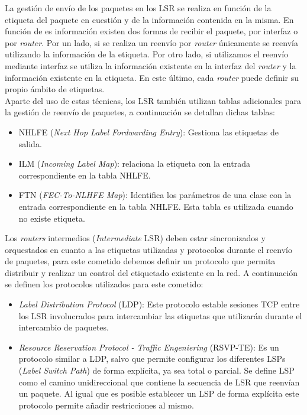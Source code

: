 	 La gestión de envío de los paquetes en los LSR se realiza en función de la etiqueta del paquete en cuestión y de la información contenida en la misma. En función de es información existen dos formas de recibir el paquete, por interfaz o por \textit{router}. Por un lado, si se realiza un reenvío por \textit{router} únicamente se reenvía utilizando la información de la etiqueta. Por otro lado, si utilizamos el reenvío mediante interfaz se utiliza la información existente en la interfaz del \textit{router} y la información existente en la etiqueta. En este último, cada \textit{router} puede definir su propio ámbito de etiquetas.\\
	 Aparte del uso de estas técnicas, los LSR también utilizan tablas adicionales para la gestión de reenvío de paquetes, a continuación se detallan dichas tablas:
	 \begin{itemize}
	     \item NHLFE (\textit{Next Hop Label Fordwarding Entry}): Gestiona las etiquetas de salida.
	     \item ILM (\textit{Incoming Label Map}): relaciona la etiqueta con la entrada correspondiente en la tabla NHLFE.
	     \item FTN (\textit{FEC-To-NLHFE Map}): Identifica los parámetros de una clase con la entrada correspondiente en la tabla NHLFE. Esta tabla es utilizada cuando no existe etiqueta.
	 \end{itemize}
	 Los \textit{routers} intermedios (\textit{Intermediate} LSR) deben estar sincronizados y orquestados en cuanto a las etiquetas utilizadas y protocolos durante el reenvío de paquetes, para este cometido debemos definir un protocolo que permita distribuir y realizar un control del etiquetado existente en la red. A continuación se definen los protocolos utilizados para este cometido:
	 \begin{itemize}
	     \item \textit{Label Distribution Protocol} (LDP): Este protocolo estable sesiones TCP entre los LSR involucrados para intercambiar las etiquetas que utilizarán durante el intercambio de paquetes.
	     \item \textit{Resource Reservation Protocol - Traffic Engeniering} (RSVP-TE): Es un protocolo similar a LDP, salvo que permite configurar los diferentes LSPs (\textit{Label Switch Path}) de forma explícita, ya sea total o parcial. Se define LSP como el camino unidireccional que contiene la secuencia de LSR que reenvían un paquete. Al igual que es posible establecer un LSP de forma explícita este protocolo permite añadir restricciones al mismo.
	 \end{itemize}
	 
